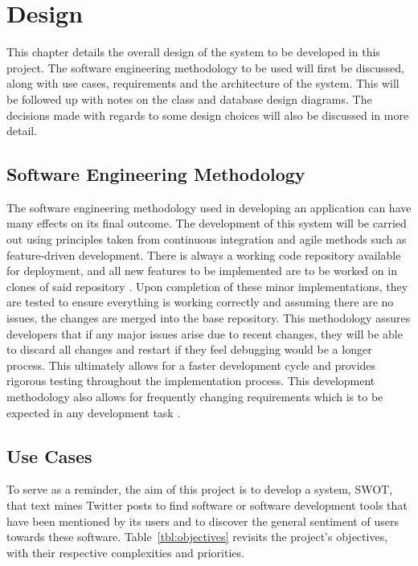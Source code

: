 \chapter{Design}
\label{cha:design}
This chapter details the overall design of the system to be developed in this project. The software engineering methodology to be used will first be discussed, along with use cases, requirements and the architecture of the system. This will be followed up with notes on the class and database design diagrams. The decisions made with regards to some design choices will also be discussed in more detail.

\section{Software Engineering Methodology}
The software engineering methodology used in developing an application can have many effects on its final outcome. The development of this system will be carried out using principles taken from continuous integration and agile methods such as feature-driven development. There is always a working code repository available for deployment, and all new features to be implemented are to be worked on in clones of said repository \cite{duvall2007ci}. Upon completion of these minor implementations, they are tested to ensure everything is working correctly and assuming there are no issues, the changes are merged into the base repository. This methodology assures developers that if any major issues arise due to recent changes, they will be able to discard all changes and restart if they feel debugging would be a longer process. This ultimately allows for a faster development cycle and provides rigorous testing throughout the implementation process. This development methodology also allows for frequently changing requirements which is to be expected in any development task \cite{duvall2007ci}.

\section{Use Cases}
\label{sec:uc}
To serve as a reminder, the aim of this project is to develop a system, SWOT, that text mines Twitter posts to find software or software development tools that have been mentioned by its users and to discover the general sentiment of users towards these software. Table~\ref{tbl:objectives} revisits the project's objectives, with their respective complexities and priorities.

